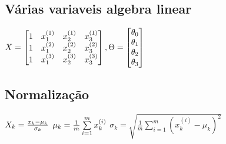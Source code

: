 \documentclass{article}
\begin{document}
	\subsection{Várias variaveis algebra linear}
	$
	X=\begin{bmatrix}
	1 & x^{(1)}_1 & x^{(1)}_2 & x^{(1)}_3 \\
	1 & x^{(2)}_1 & x^{(2)}_2 & x^{(2)}_3 \\
	1 & x^{(3)}_1 & x^{(3)}_2 & x^{(3)}_3 \\
	\end{bmatrix},
	\Theta=\begin{bmatrix}
	\theta_0 \\
	\theta_1 \\
	\theta_2 \\
	\theta_3
	\end{bmatrix}\\
	$

	\subsection{Normalização}
	
	$X_k=\frac{x_k-\mu_k}{\sigma_k}\\$
	$\mu_k=\frac{1}{m}\sum\limits_{i=1}^{m}x_k^{(i)}\\$
	$\sigma_k=\sqrt{\frac{1}{m}\sum\limits_{i=1}^{m}(x_k^{(i)}-\mu_k)^2}$
\end{document}
